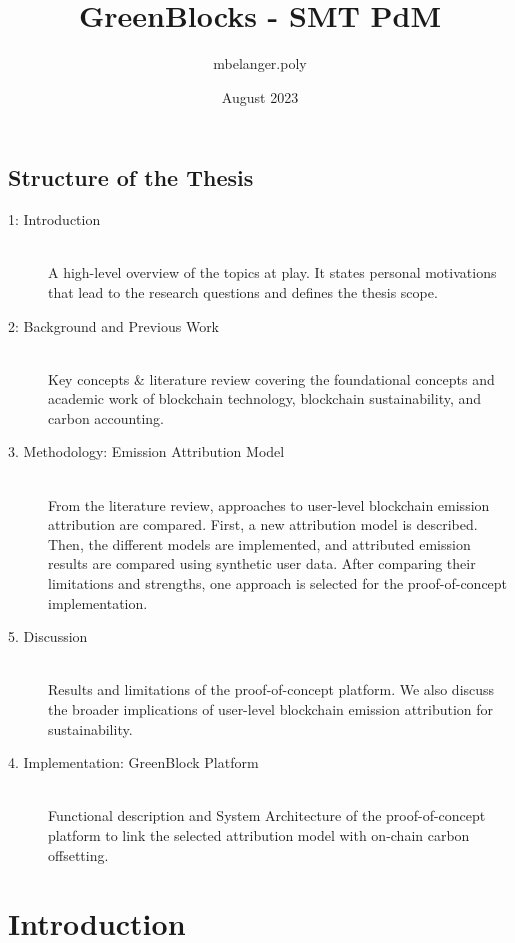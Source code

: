 \documentclass[11pt]{report}
\title{GreenBlocks - SMT PdM}
\author{mbelanger.poly}
\date{August 2023}
\begin{document}




\newpage
\tableofcontents



\newpage

\section*{Structure of the Thesis}


\begin{description}
    \item [1: Introduction] \hfill \\
          A high-level overview of the topics at play. It states personal motivations that lead to the research questions and defines the thesis scope.
    \item [2: Background and Previous Work] \hfill \\
          Key concepts \& literature review covering the foundational concepts and academic work of blockchain technology, blockchain sustainability, and carbon accounting.
    \item [3. Methodology: Emission Attribution Model] \hfill \\
          From the literature review, approaches to user-level blockchain emission attribution are compared. First, a new attribution model is described. Then, the different models are implemented, and attributed emission results are compared using synthetic user data. After comparing their limitations and strengths, one approach is selected for the proof-of-concept implementation.
    \item [5. Discussion] \hfill \\
          Results and limitations of the proof-of-concept platform. We also discuss the broader implications of user-level blockchain emission attribution for sustainability.
    \item [4. Implementation: GreenBlock Platform] \hfill \\
          Functional description and System Architecture of the proof-of-concept platform to link the selected attribution model with on-chain carbon offsetting.

\end{description}

\printacronyms
\printglossary

\chapter{Introduction}
\end{document}
